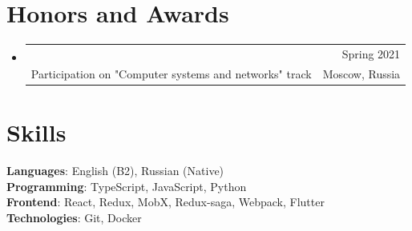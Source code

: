 \documentclass[A4,11pt]{article}
\makeatletter
\newcommand{\CVSubheading}[4]{
  \vspace{-2pt}\item
    \begin{tabular*}{0.97\textwidth}[t]{l@{\extracolsep{\fill}}r}
      \textbf{#1} & #2 \\
      \small#3 & \small #4 \\
    \end{tabular*}\vspace{-7pt}
}
\newcommand{\lowDescendersUnderline}[1]{%
  \uline{\phantom{#1}}%
  \llap{\contour{white}{#1}}%
}
\newcommand{\link}[2]{
  \href{#1}{\lowDescendersUnderline{#2}}
}
\newcommand{\CVSubHeadingListStart}{\begin{itemize}[leftmargin=0.5cm, label={}]}
\newcommand{\CVSubHeadingListEnd}{\end{itemize}}
\makeatother
\begin{document}
\section{Honors and Awards}
  \CVSubHeadingListStart
    \CVSubheading
      {\link{https://olymp.hse.ru/ma/}{2nd degree diploma of the HSE olympiad "Major League"}}{Spring 2021}
      {Participation on "Computer systems and networks" track}{Moscow, Russia}
  \CVSubHeadingListEnd

\section{Skills}
 \begin{itemize}[leftmargin=0.5cm, label={}]
    \small{\item{
     \textbf{Languages}{: English (B2), Russian (Native) } \\
     \textbf{Programming}{: TypeScript, JavaScript, Python } \\
     \textbf{Frontend}{: React, Redux, MobX, Redux-saga, Webpack, Flutter } \\
     \textbf{Technologies}{: Git, Docker } \\
    }}
 \end{itemize}
    
\end{document}
